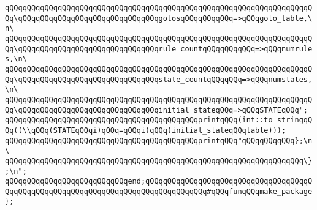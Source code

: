 \verb|qQQqqQQqqQQqqQQqqQQqqQQqqQQqqQQqqQQqqQQqqQQqqQQqqQQqqQQqqQQqqQQqqQQqqQQq\qQQqqQQqqQQqqQQqqQQqqQQqqQQqqQQqgotosqQQqqQQqqQQq=>qQQqgoto_table,\n\|\newline
\verb|qQQqqQQqqQQqqQQqqQQqqQQqqQQqqQQqqQQqqQQqqQQqqQQqqQQqqQQqqQQqqQQqqQQqqQQq\qQQqqQQqqQQqqQQqqQQqqQQqqQQqqQQqrule_countqQQqqQQqqQQq=>qQQqnumrules,\n\|\newline
\verb|qQQqqQQqqQQqqQQqqQQqqQQqqQQqqQQqqQQqqQQqqQQqqQQqqQQqqQQqqQQqqQQqqQQqqQQq\qQQqqQQqqQQqqQQqqQQqqQQqqQQqqQQqstate_countqQQqqQQq=>qQQqnumstates,\n\|\newline
\verb|qQQqqQQqqQQqqQQqqQQqqQQqqQQqqQQqqQQqqQQqqQQqqQQqqQQqqQQqqQQqqQQqqQQqqQQq\qQQqqQQqqQQqqQQqqQQqqQQqqQQqqQQqinitial_stateqQQq=>qQQqSTATEqQQq";|\newline
\newline
\verb|qQQqqQQqqQQqqQQqqQQqqQQqqQQqqQQqqQQqqQQqqQQqprintqQQq(int::to_stringqQQq((\\qQQq(STATEqQQqi)qQQq=qQQqi)qQQq(initial_stateqQQqtable)));|\newline
\newline
\verb|qQQqqQQqqQQqqQQqqQQqqQQqqQQqqQQqqQQqqQQqqQQqprintqQQq"qQQqqQQqqQQq};\n\|\newline
\verb|qQQqqQQqqQQqqQQqqQQqqQQqqQQqqQQqqQQqqQQqqQQqqQQqqQQqqQQqqQQqqQQqqQQq\};\n";|\newline
\verb|qQQqqQQqqQQqqQQqqQQqqQQqqQQqend;qQQqqQQqqQQqqQQqqQQqqQQqqQQqqQQqqQQqqQQqqQQqqQQqqQQqqQQqqQQqqQQqqQQqqQQqqQQqqQQqqQQq#qQQqfunqQQqmake_package|\newline
\verb|};|\newline

